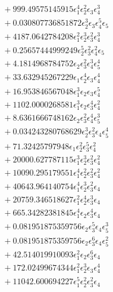 \documentclass[10pt]{article}
\begin{document}
\begin{align*}
&{}  + 999.49575145915 \epsilon_{1}^{4} \epsilon_{2}^{2} \epsilon_{3} \epsilon_{4}^{3} \\
&{}  + 0.030807736851872 \epsilon_{2}^{3} \epsilon_{3} \epsilon_{4}^{5} \epsilon_{5} \\
&{}  + 4187.0642784208 \epsilon_{1}^{2} \epsilon_{2}^{3} \epsilon_{3}^{2} \epsilon_{4}^{3} \\
&{}  + 0.25657444999249 \epsilon_{2}^{5} \epsilon_{3}^{2} \epsilon_{4}^{2} \epsilon_{5} \\
&{}  + 4.1814968784752 \epsilon_{2} \epsilon_{3}^{2} \epsilon_{4}^{3} \epsilon_{5}^{4} \\
&{}  + 33.632945267229 \epsilon_{1} \epsilon_{2}^{4} \epsilon_{3} \epsilon_{4}^{4} \\
&{}  + 16.953846567048 \epsilon_{1}^{3} \epsilon_{2} \epsilon_{3} \epsilon_{4}^{5} \\
&{}  + 1102.0000268581 \epsilon_{1}^{3} \epsilon_{2} \epsilon_{3}^{4} \epsilon_{4}^{2} \\
&{}  + 8.6361666748162 \epsilon_{2} \epsilon_{3}^{2} \epsilon_{4}^{4} \epsilon_{5}^{3} \\
&{}  + 0.034243280768629 \epsilon_{2}^{3} \epsilon_{3}^{2} \epsilon_{4} \epsilon_{5}^{4} \\
&{}  + 71.32425797948 \epsilon_{1} \epsilon_{2}^{2} \epsilon_{3}^{5} \epsilon_{4}^{2} \\
&{}  + 20000.627787115 \epsilon_{1}^{3} \epsilon_{2}^{3} \epsilon_{3}^{2} \epsilon_{4}^{2} \\
&{}  + 10090.295179551 \epsilon_{1}^{4} \epsilon_{2}^{2} \epsilon_{3}^{2} \epsilon_{4}^{2} \\
&{}  + 40643.964140754 \epsilon_{1}^{4} \epsilon_{2}^{3} \epsilon_{3}^{2} \epsilon_{4} \\
&{}  + 20759.346518627 \epsilon_{1}^{2} \epsilon_{2}^{4} \epsilon_{3}^{3} \epsilon_{4} \\
&{}  + 665.34282381845 \epsilon_{1}^{4} \epsilon_{2} \epsilon_{3}^{4} \epsilon_{4} \\
&{}  + 0.081951875359756 \epsilon_{2} \epsilon_{3}^{5} \epsilon_{4} \epsilon_{5}^{3} \\
&{}  + 0.081951875359756 \epsilon_{2} \epsilon_{3}^{6} \epsilon_{4} \epsilon_{5}^{2} \\
&{}  + 42.514019910093 \epsilon_{1}^{2} \epsilon_{2} \epsilon_{3}^{6} \epsilon_{4} \\
&{}  + 172.02499674344 \epsilon_{1}^{2} \epsilon_{2}^{3} \epsilon_{3} \epsilon_{4}^{4} \\
&{}  + 11042.600694227 \epsilon_{1}^{5} \epsilon_{2}^{2} \epsilon_{3}^{2} \epsilon_{4} \\

\end{align*}
\end{document}
